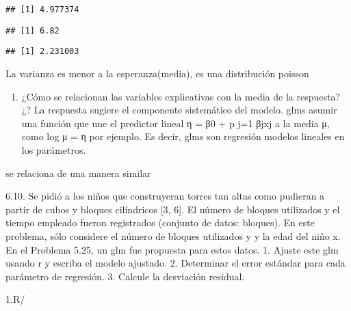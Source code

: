 \documentclass[
]{article}
\newenvironment{Shaded}{\begin{snugshade}}{\end{snugshade}}
\newcommand{\FunctionTok}[1]{\textcolor[rgb]{0.00,0.00,0.00}{#1}}
\newcommand{\NormalTok}[1]{#1}
\newcommand{\SpecialCharTok}[1]{\textcolor[rgb]{0.00,0.00,0.00}{#1}}
\providecommand{\tightlist}{%
  \setlength{\itemsep}{0pt}\setlength{\parskip}{0pt}}
\begin{document}
\begin{verbatim}
## [1] 4.977374
\end{verbatim}

\begin{Shaded}
\end{Shaded}

\begin{verbatim}
## [1] 6.82
\end{verbatim}

\begin{Shaded}
\end{Shaded}

\begin{verbatim}
## [1] 2.231003
\end{verbatim}

La varianza es menor a la esperanza(media), es una distribución poisson

\begin{enumerate}
\def\labelenumi{\arabic{enumi}.}
\setcounter{enumi}{1}
\tightlist
\item
  ¿Cómo se relacionan las variables explicativas con la media de la
  respuesta? ¿? La respuesta sugiere el componente sistemático del
  modelo. glms asumir una función que une el predictor lineal η = β0 + p
  j=1 βjxj a la media μ, como log μ = η por ejemplo. Es decir, glms son
  regresión modelos lineales en los parámetros.
\end{enumerate}

se relaciona de una manera similar

6.10. Se pidió a los niños que construyeran torres tan altas como
pudieran a partir de cubos y bloques cilíndricos {[}3, 6{]}. El número
de bloques utilizados y el tiempo empleado fueron registrados (conjunto
de datos: bloques). En este problema, sólo considere el número de
bloques utilizados y y la edad del niño x. En el Problema 5.25, un glm
fue propuesta para estos datos. 1. Ajuste este glm usando r y escriba el
modelo ajustado. 2. Determinar el error estándar para cada parámetro de
regresión. 3. Calcule la desviación residual.

1.R/
\end{document}
